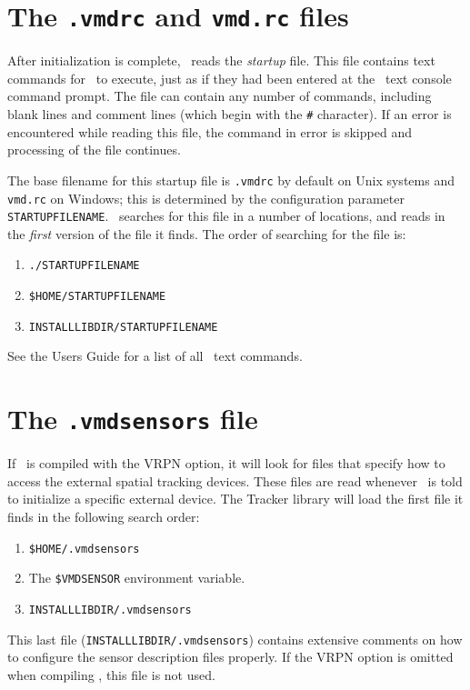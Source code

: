 
\section{The {\tt .vmdrc} and {\tt vmd.rc} files}

After initialization is complete, \VMD\ reads the {\em startup} file.  This file contains text commands
for \VMD\ to execute, just as if they had been entered at the \VMD\
text console command prompt.  The file can contain any number of
commands, including blank lines and comment lines (which begin with
the {\tt \#} character).  If an error is encountered while reading
this file, the command in error is skipped and processing of the file
continues.

The base filename for this startup file is {\tt .vmdrc} by default
on Unix systems and {\tt vmd.rc} on Windows;
this is determined by the configuration parameter {\tt STARTUPFILENAME}.
\VMD\ searches for this file in a number of locations,
and reads in the {\em first} version of the file it finds.  The order
of searching for the file is:
\begin{enumerate}
  \item {\tt ./STARTUPFILENAME}
  \item {\tt \$HOME/STARTUPFILENAME}
  \item {\tt INSTALLLIBDIR/STARTUPFILENAME}
\end{enumerate}
See the Users Guide for a list of all \VMD\ text commands.

\section{The {\tt .vmdsensors} file}

If \VMD\ is compiled with the VRPN option, it will look for files that specify how to access the external spatial
tracking devices. These files are read whenever \VMD\ is told to
initialize a specific external device.  The Tracker library will load 
the first file it finds in the following search order:
\begin{enumerate}
  \item {\tt \$HOME/.vmdsensors}
  \item The {\tt \$VMDSENSOR}  environment variable.
  \item {\tt INSTALLLIBDIR/.vmdsensors}
\end{enumerate}

This last file ({\tt INSTALLLIBDIR/.vmdsensors}) contains extensive 
comments on how to configure the sensor description files
properly. If the VRPN option is omitted when compiling \VMD, 
this file is not used.
